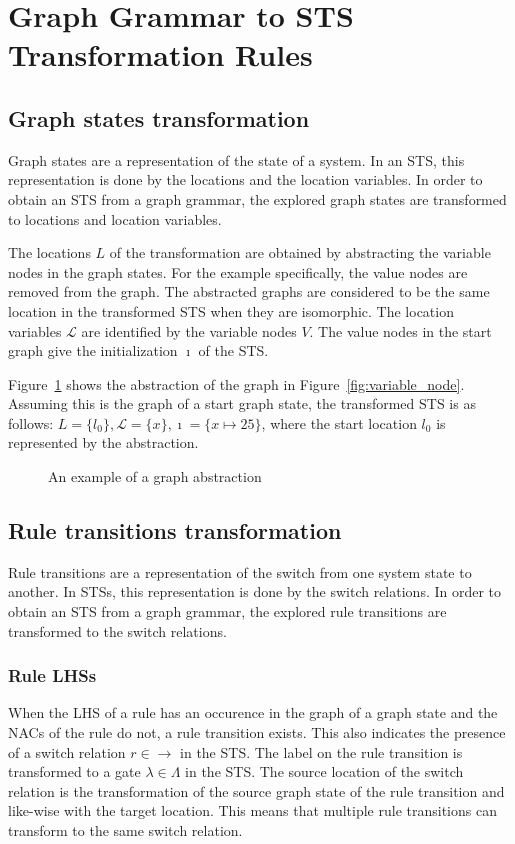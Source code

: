\section{Graph Grammar to STS Transformation Rules}\label{sec:gg-to-sts}

\subsection{Graph states transformation}
Graph states are a representation of the state of a system. In an STS, this representation is done by the locations and the location variables. In order to obtain an STS from a graph grammar, the explored graph states are transformed to locations and location variables. 

The locations $L$ of the transformation are obtained by abstracting the variable nodes in the graph states. For the example specifically, the value nodes are removed from the graph. The abstracted graphs are considered to be the same location in the transformed STS when they are isomorphic. The location variables $\mathcal{L}$ are identified by the variable nodes $V$. The value nodes in the start graph give the initialization $\imath$ of the STS.

Figure~\ref{fig:abstract_graph} shows the abstraction of the graph in Figure~\ref{fig:variable_node}. Assuming this is the graph of a start graph state, the transformed STS is as follows: $L = \{l_0\}, \mathcal{L} = \{x\}, \imath = \{x \mapsto 25\}$, where the start location $l_0$ is represented by the abstraction.

\begin{figure}[ht]
  \begin{center}
    
  \end{center}
  \caption{An example of a graph abstraction}
  \label{fig:abstract_graph}
\end{figure}

\subsection{Rule transitions transformation}
Rule transitions are a representation of the switch from one system state to another. In STSs, this representation is done by the switch relations. In order to obtain an STS from a graph grammar, the explored rule transitions are transformed to the switch relations.

\subsubsection{Rule LHSs}\label{sec:rule_lhss}
When the LHS of a rule has an occurence in the graph of a graph state and the NACs of the rule do not, a rule transition exists. This also indicates the presence of a switch relation $r \in \rightarrow$ in the STS. The label on the rule transition is transformed to a gate $\lambda \in \Lambda$ in the STS. The source location of the switch relation is the transformation of the source graph state of the rule transition and like-wise with the target location. This means that multiple rule transitions can transform to the same switch relation.

